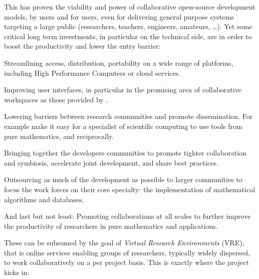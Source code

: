 This has proven the viability and power of collaborative open-source development models,
by users and for users, even for delivering general purpose systems targeting a large
public (researchers, teachers, engineers, amateurs, \ldots). Yet some critical long term
investments, in particular on the technical side, are in order to boost the productivity
and lower the entry barrier:
\begin{compactitem}
\item Streamlining access, distribution, portability on a wide range of platforms, including
  High Performance Computers or cloud services.
\item Improving user interfaces, in particular in the promising area of collaborative
  workspaces as those provided by \SMC.
\item Lowering barriers between research communities and promote dissemination. For example
  make it easy for a specialist of scientific computing to use tools from pure
  mathematics, and reciprocally.
\item Bringing together the developers communities to promote tighter collaboration and
  symbiosis, accelerate joint development, and share best practices.
\item Outsourcing as much of the development as possible to larger communities to focus
  the work forces on their core specialty: the implementation of mathematical algorithms
  and databases.
\item And last but not least: Promoting collaborations at all scales to further improve
  the productivity of researchers in pure mathematics and applications.
\end{compactitem}
These can be subsumed by the goal of \emph{Virtual Research Environments} (VRE), that is
online services enabling groups of researchers, typically widely dispersed, to work
collaboratively on a per project basis. This is exactly where the \ODK project kicks in:




